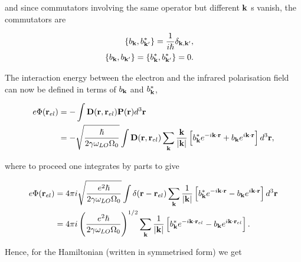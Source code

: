 and since commutators involving the same operator but different $\vb{k}$ s vanish, the commutators are

\begin{subequations}
\begin{align}
    \begin{split}
        \left\{b_{\vb{k}},b^*_{\vb{k'}}\right\} &= \frac{1}{i\hslash} \delta_{\vb{k}, \vb{k'}},
    \end{split}\\
    \begin{split}
        \left\{b_{\vb{k}},b_{\vb{k'}}\right\} &= \left\{b^*_{\vb{k}},b^*_{\vb{k'}}\right\} = 0.
    \end{split}
\end{align}
\end{subequations}  

The interaction energy between the electron and the infrared polarisation field can now be defined in terms of $b_{\vb{k}}$ and $b^*_{\vb{k}}$,

\begin{equation}
    \begin{aligned}
    e \Phi (\vb{r}_{el}) &= - \int \vb{D}(\vb{r}, \vb{r}_{el}) \vb{P}(\vb{r}) d^3\vb{r} \\
    &= -\sqrt{\frac{\hslash}{2\gamma\omega_{LO}\Omega_0}} \int \vb{D}(\vb{r}, \vb{r}_{el}) \sum_{\vb{k}} \frac{\vb{k}}{\abs{\vb{k}}} \left[b_{\vb{k}}^* e^{-i\vb{k}\cdot\vb{r}} + b_{\vb{k}} e^{i\vb{k}\cdot\vb{r}} \right] d^3\vb{r},
    \end{aligned}
\end{equation}

where to proceed one integrates by parts to give

\begin{equation} \label{eqn:phi}
    \begin{aligned}
    e \Phi (\vb{r}_{el}) &= 4\pi i \sqrt{\frac{e^2 \hslash}{2\gamma\omega_{LO}\Omega_0}} \int \delta(\vb{r} - \vb{r}_{el}) \sum_{\vb{k}} \frac{1}{\abs{\vb{k}}} \left[b_{\vb{k}}^* e^{-i\vb{k}\cdot\vb{r}} - b_{\vb{k}} e^{i\vb{k}\cdot\vb{r}} \right] d^3\vb{r} \\
    &= 4\pi i \left( \frac{e^2 \hslash}{2 \gamma \omega_{LO} \Omega_0} \right)^{1/2} \sum_{\vb{k}} \frac{1}{\abs{\vb{k}}} \left[b_{\vb{k}}^* e^{-i\vb{k} \cdot \vb{r}_{el}} - b_{\vb{k}} e^{i\vb{k} \cdot \vb{r}_{el}}\right].
    \end{aligned}
\end{equation}

Hence, for the Hamiltonian (written in symmetrised form) we get

